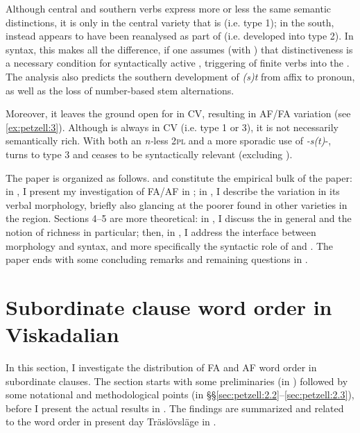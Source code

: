 \documentclass[output=paper,colorlinks,citecolor=brown,draft,draftmode]{langscibook}
\begin{document}
Although central and southern  verbs express more or less the same semantic distinctions, it is only in the central variety that  is  (i.e. type 1); in the south,  instead appears to have been reanalysed as part of  (i.e. developed into type 2). In syntax, this makes all the difference, if one assumes (with \citealt{BobaljikThrainsson1998}) that distinctiveness is a necessary condition for syntactically active , triggering  of finite verbs into the . The analysis also predicts the southern development of \textit{(s)t} from affix to pronoun, as well as the loss of number-based stem alternations. 



Moreover, it leaves the ground open for  in CV, resulting in AF/FA variation (see \ref{ex:petzell:3}). Although  is always  in CV (i.e. type 1 or 3), it is not necessarily semantically rich. With both an \textit{n-}less 2\textsc{pl} and a more sporadic use of \textit{-s(t)}-,  turns to type 3 and ceases to be syntactically relevant (excluding ).



The paper is organized as follows.  and  constitute the empirical bulk of the paper: in , I present my investigation of FA/AF in ; in , I describe the variation in its verbal morphology, briefly also glancing at the poorer  found in other varieties in the region. Sections 4–5 are more theoretical: in , I discuss the  in general and the notion of richness in particular; then, in , I address the interface between morphology and syntax, and more specifically the syntactic role of  and  . The paper ends with some concluding remarks and remaining questions in .


\section{Subordinate clause word order in Viskadalian}\label{sec:petzell:2}


In this section, I investigate the distribution of FA and AF word order in  subordinate clauses. The section starts with some preliminaries (in ) followed by some notational and methodological points (in §§\ref{sec:petzell:2.2}--\ref{sec:petzell:2.3}), before I present the actual results in . The findings are summarized and related to the word order in present day Träslövsläge in .
\end{document}
